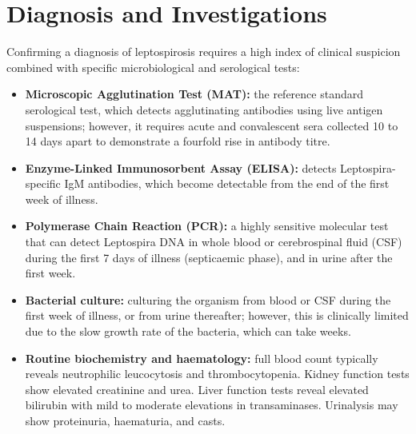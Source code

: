 \section*{Diagnosis and Investigations}
Confirming a diagnosis of leptospirosis requires a high index of clinical suspicion combined with specific microbiological and serological tests:
\begin{itemize}
    \item \textbf{Microscopic Agglutination Test (MAT):} the reference standard serological test, which detects agglutinating antibodies using live antigen suspensions; however, it requires acute and convalescent sera collected 10 to 14 days apart to demonstrate a fourfold rise in antibody titre.
    \item \textbf{Enzyme-Linked Immunosorbent Assay (ELISA):} detects Leptospira-specific IgM antibodies, which become detectable from the end of the first week of illness.
    \item \textbf{Polymerase Chain Reaction (PCR):} a highly sensitive molecular test that can detect Leptospira DNA in whole blood or cerebrospinal fluid (CSF) during the first 7 days of illness (septicaemic phase), and in urine after the first week.
    \item \textbf{Bacterial culture:} culturing the organism from blood or CSF during the first week of illness, or from urine thereafter; however, this is clinically limited due to the slow growth rate of the bacteria, which can take weeks.
    \item \textbf{Routine biochemistry and haematology:} full blood count typically reveals neutrophilic leucocytosis and thrombocytopenia. Kidney function tests show elevated creatinine and urea. Liver function tests reveal elevated bilirubin with mild to moderate elevations in transaminases. Urinalysis may show proteinuria, haematuria, and casts.
\end{itemize}

